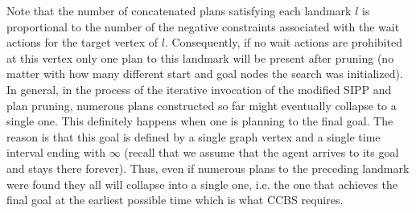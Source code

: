 \documentclass[letterpaper]{article} %
\newcommand{\ccbs}{\ac{CCBS}\xspace}
\newcommand{\ccbsds}{\ac{CCBS-DS}\xspace}
\newcommand{\sipp}{\ac{SIPP}\xspace}
\begin{document}




Note that the number of concatenated plans satisfying each landmark $l$ is proportional to the number of the negative constraints associated with the wait actions for the target vertex of $l$. 
Consequently, if no wait actions are prohibited at this vertex only one plan to this landmark will be present after pruning (no matter with how many different start and goal nodes the search was initialized). 
In general, in the process of the iterative invocation of the modified \sipp and plan pruning, numerous plans constructed so far might eventually collapse to a single one. This definitely happens when one is planning to the final goal. The reason is that this goal is defined by a single graph vertex and a single time interval ending with $\infty$ (recall that we assume that the agent arrives to its goal and stays there forever). Thus, even if numerous plans to the preceding landmark were found they all will collapse into a single one, i.e. the one that achieves the final goal at the earliest possible time which is what \ccbs requires.
 
 
 
 
 
\end{document}
